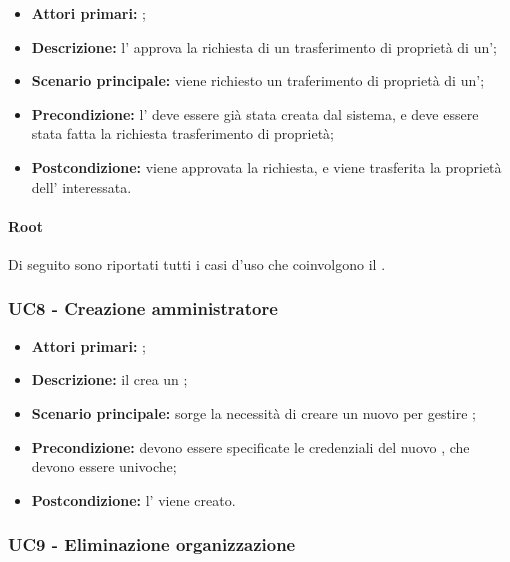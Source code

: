 \documentclass[casi-duso]{subfiles}
\begin{document}
\begin{itemize}
  \item \textbf{Attori primari:} ;
  \item \textbf{Descrizione:} l' approva la richiesta di un trasferimento di proprietà di un';
  \item \textbf{Scenario principale:} viene richiesto un traferimento di proprietà di un';
  \item \textbf{Precondizione:} l' deve essere già stata creata dal sistema, e deve essere stata fatta la richiesta trasferimento di proprietà;
  \item \textbf{Postcondizione:} viene approvata la richiesta, e viene trasferita la proprietà dell' interessata.

\end{itemize}
\paragraph{Root}
Di seguito sono riportati tutti i casi d'uso che coinvolgono il  .

\subsubsection{UC8 - Creazione amministratore}
\label{subsub:UC8}

\begin{itemize}
  \item \textbf{Attori primari:} ;
  \item \textbf{Descrizione:} il  crea un  ;
  \item \textbf{Scenario principale:} sorge la necessità di creare un nuovo  per gestire ;
  \item \textbf{Precondizione:} devono essere specificate le credenziali del nuovo , che devono essere univoche;
  \item \textbf{Postcondizione:} l' viene creato.

\end{itemize}

\subsubsection{UC9 - Eliminazione organizzazione}
\label{subsub:UC9}
\end{document}
